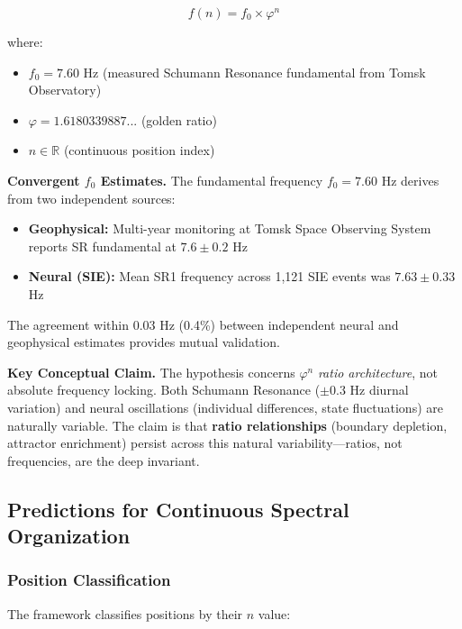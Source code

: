 \documentclass[11pt,a4paper]{article}
\newcommand{\phisym}{\varphi}
\begin{document}
\begin{keyequation}
\begin{equation}
f(n) = f_0 \times \phisym^n
\label{eq:core}
\end{equation}

where:
\begin{itemize}
    \item $f_0 = 7.60$ Hz (measured Schumann Resonance fundamental from Tomsk Observatory)
    \item $\phisym = 1.6180339887...$ (golden ratio)
    \item $n \in \mathbb{R}$ (continuous position index)
\end{itemize}
\end{keyequation}

\textbf{Convergent $f_0$ Estimates.}
The fundamental frequency $f_0 = 7.60$ Hz derives from two independent sources:
\begin{itemize}
    \item \textbf{Geophysical:} Multi-year monitoring at Tomsk Space Observing System reports SR fundamental at $7.6 \pm 0.2$ Hz
    \item \textbf{Neural (SIE):} Mean SR1 frequency across 1,121 SIE events was $7.63 \pm 0.33$ Hz
\end{itemize}

The agreement within 0.03 Hz (0.4\%) between independent neural and geophysical estimates provides mutual validation.

\textbf{Key Conceptual Claim.}
The hypothesis concerns $\phisym^n$ \textit{ratio architecture}, not absolute frequency locking. Both Schumann Resonance ($\pm 0.3$ Hz diurnal variation) and neural oscillations (individual differences, state fluctuations) are naturally variable. The claim is that \textbf{ratio relationships} (boundary depletion, attractor enrichment) persist across this natural variability---ratios, not frequencies, are the deep invariant.

\subsection{Predictions for Continuous Spectral Organization}

\subsubsection{Position Classification}
The framework classifies positions by their $n$ value:
\end{document}
